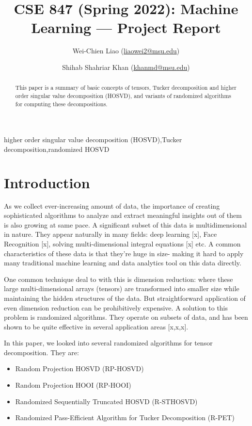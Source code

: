 \documentclass[preprint]{elsarticle}
\title{\textbf{\large{CSE 847 (Spring 2022): Machine Learning --- Project Report}}}
\author[1]{Wei-Chien Liao (\href{mailto:liaowei2@msu.edu}{liaowei2@msu.edu})}
\author[1]{Shihab Shahriar Khan (\href{mailto:khanmd@msu.edu}{khanmd@msu.edu})}
\date{}
\begin{document}
\begin{frontmatter}
\begin{abstract}
    This paper is a summary of basic concepts of tensors, Tucker decomposition and higher order singular value decomposition (HOSVD), and variants
    of randomized algorithms for computing these decompositions.
\end{abstract}
\begin{keyword}
    higher order singular value decomposition (HOSVD)\sep Tucker decomposition\sep randomized HOSVD
\end{keyword}
\end{frontmatter}
\section{Introduction}
As we collect ever-increasing amount of data, the importance of creating sophisticated algorithms to analyze and extract meaningful insights out of them is also growing at same pace. A significant subset of this data is multidimensional in nature. They appear naturally in many fields: deep learning [x], Face Recognition [x], solving multi-dimensional integral equations [x] etc. A common characteristics of these data is that they're huge in size- making it hard to apply many traditional machine learning and data analytics tool on this data directly.

\noindent One common technique deal to with this is dimension reduction: where these large multi-dimensional arrays (tensors) are transformed into smaller size while maintaining the hidden structures of the data. But straightforward application of even dimension reduction can be prohibitively expensive. A solution to this problem is randomized algorithms. They operate on subsets of data, and has been shown to be quite effective in several application areas [x,x,x].

\noindent In this paper, we looked into several randomized algorithms for tensor decomposition. They are:

\begin{itemize}
    \item Random Projection HOSVD (RP-HOSVD)
    \item Random Projection HOOI (RP-HOOI)
    \item Randomized Sequentially Truncated HOSVD (R-STHOSVD)
    \item Randomized Pass-Efficient Algorithm for Tucker Decomposition (R-PET)
\end{itemize}
\end{document}
